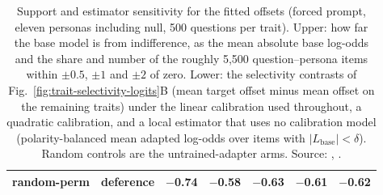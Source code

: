 \begin{table}[t]
\begin{tabular}{llrrrrr}
random-perm & deference & $-$0.74 & $-$0.58 & $-$0.63 & $-$0.61 & $-$0.62 \\
\bottomrule
\end{tabular}
\caption{Support and estimator sensitivity for the fitted offsets (forced prompt, eleven personas including null, 500 questions per trait). Upper: how far the base model is from indifference, as the mean absolute base log-odds and the share and number of the roughly 5{,}500 question--persona items within $\pm0.5$, $\pm1$ and $\pm2$ of zero. Lower: the selectivity contrasts of Fig.~\ref{fig:trait-selectivity-logits}B (mean target offset minus mean offset on the remaining traits) under the linear calibration used throughout, a quadratic calibration, and a local estimator that uses no calibration model (polarity-balanced mean adapted log-odds over items with $|L_{\mathrm{base}}|<\delta$). Random controls are the untrained-adapter arms. Source: , .}
\label{tab:offset-robustness}
\end{table}
